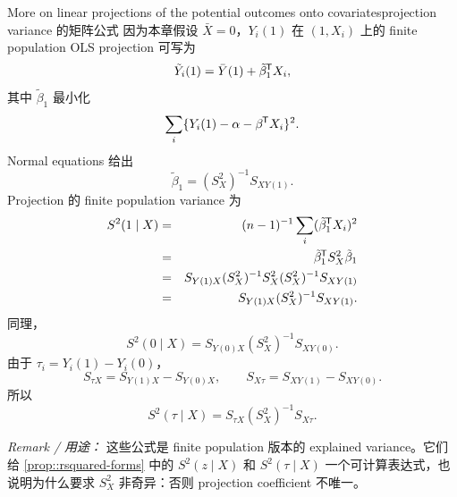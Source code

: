 \begin{exercisesolution}{More on linear projections of the potential outcomes onto covariates}{projection variance 的矩阵公式}
因为本章假设 $\bar X=0$，$Y_i(1)$ 在 $(1,X_i)$ 上的 finite population OLS projection 可写为
\[
\tilde Y_i(1)=\bar Y(1)+\tilde\beta_1^{\mkern-1.5mu\mathsf{T}} X_i,
\]
其中 $\tilde\beta_1$ 最小化
\[
\sum_i\{Y_i(1)-\alpha-\beta^{\mkern-1.5mu\mathsf{T}} X_i\}^2.
\]
Normal equations 给出
\[
\tilde\beta_1=(S_X^2)^{-1}S_{XY(1)}.
\]
Projection 的 finite population variance 为
\begin{eqnarray*}
S^2(1\mid X)
&=&(n-1)^{-1}\sum_i(\tilde\beta_1^{\mkern-1.5mu\mathsf{T}} X_i)^2\\
&=&\tilde\beta_1^{\mkern-1.5mu\mathsf{T}} S_X^2\tilde\beta_1\\
&=&S_{Y(1)X}(S_X^2)^{-1}S_X^2(S_X^2)^{-1}S_{XY(1)}\\
&=&S_{Y(1)X}(S_X^2)^{-1}S_{XY(1)}.
\end{eqnarray*}
同理，
\[
S^2(0\mid X)
=S_{Y(0)X}(S_X^2)^{-1}S_{XY(0)}.
\]
由于 $\tau_i=Y_i(1)-Y_i(0)$，
\[
S_{\tau X}=S_{Y(1)X}-S_{Y(0)X},\qquad
S_{X\tau}=S_{XY(1)}-S_{XY(0)}.
\]
所以
\[
S^2(\tau\mid X)
=S_{\tau X}(S_X^2)^{-1}S_{X\tau}.
\]

\emph{Remark / 用途：} 这些公式是 finite population 版本的 explained variance。它们给 \cref{prop::rsquared-forms} 中的 $S^2(z\mid X)$ 和 $S^2(\tau\mid X)$ 一个可计算表达式，也说明为什么要求 $S_X^2$ 非奇异：否则 projection coefficient 不唯一。
\end{exercisesolution}

